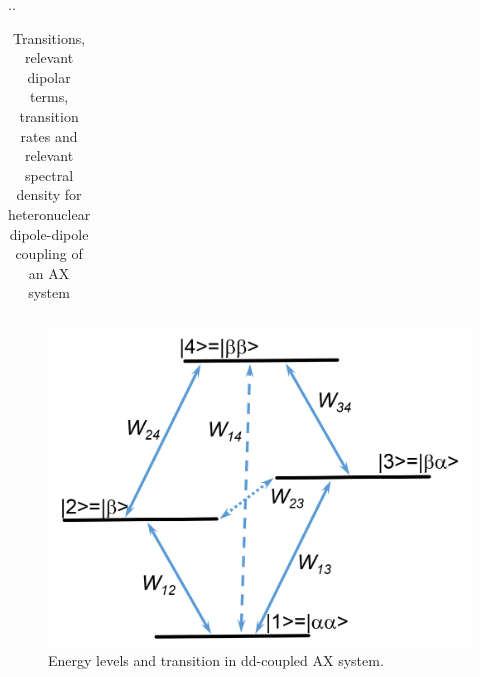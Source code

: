 \documentclass[handout]{beamer}
\begin{document}
\begin{frame}{\thesection.\thesubsection. \insertsubsection}
\begin{minipage}[t]{0.65\textwidth}
{\begin{table}[ht]
\begin{tabular}{  C{2.0cm}  C{0.3cm}  C{1.5cm}  C{1.5cm}  }
			\hline
		\end{tabular}
		\caption{Transitions, relevant dipolar terms, transition rates and relevant spectral density for heteronuclear dipole-dipole coupling of an AX system}
	\end{table}
}
\end{minipage}
\begin{minipage}[t]{0.3\textwidth}
\begin{figure}
	\centering
	\includegraphics[scale=0.2]{figures/4_level_relaxation.png}
	\caption{Energy levels and transition in dd-coupled AX system.}
\end{figure}

\end{minipage}
  
   
\end{frame}
\end{document}
